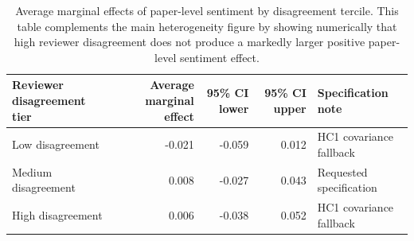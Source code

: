 \begin{table}[!htbp]
\centering
\begingroup
\normalsize
\renewcommand{\arraystretch}{1.20}
\setlength{\tabcolsep}{6pt}
\caption{Average marginal effects of paper-level sentiment by disagreement tercile. This table complements the main heterogeneity figure by showing numerically that high reviewer disagreement does not produce a markedly larger positive paper-level sentiment effect.}
\label{tab:app:heterodisagreement}
\begin{tabular}{lrrrl}
\toprule
Reviewer disagreement tier & Average marginal effect & 95\% CI lower & 95\% CI upper & Specification note \\
\midrule
Low disagreement & -0.021 & -0.059 & 0.012 & HC1 covariance fallback \\
Medium disagreement & 0.008 & -0.027 & 0.043 & Requested specification \\
High disagreement & 0.006 & -0.038 & 0.052 & HC1 covariance fallback \\
\bottomrule
\end{tabular}
\endgroup
\end{table}

